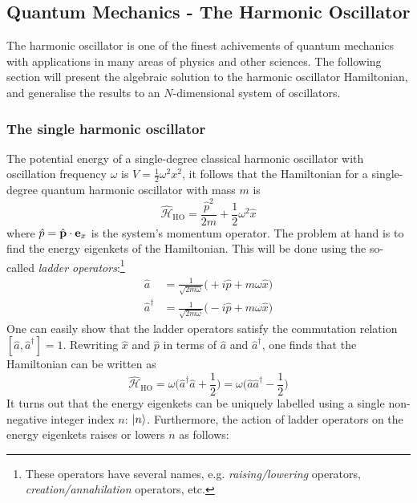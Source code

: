 \documentclass[nofootinbib,reprint,english]{revtex4-1}
\newcommand{\hatHH}{\hat{\mathcal{H}}}
\begin{document}
\subsection{Quantum Mechanics - The Harmonic Oscillator}
The harmonic oscillator is one of the finest achivements of quantum mechanics with applications in many areas of physics and other sciences. The following section will present the algebraic solution to the harmonic oscillator Hamiltonian, and generalise the results to an \(N\)-dimensional system of oscillators.
\subsubsection{The single harmonic oscillator}
The potential energy of a single-degree classical harmonic oscillator with oscillation frequency \(\omega\) is \(V=\frac{1}{2}\omega^2x^2\), it follows that the Hamiltonian for a single-degree quantum harmonic oscillator with mass \(m\) is
\begin{equation}\label{eq:Hamiltonian_harmonic_oscillator}
\hatHH_\text{HO}=\frac{\hat{p}^2}{2m}+\frac{1}{2}\omega^2\hat{x}
\end{equation}
where \(\hat{p}=\hat{\vb{p}}\cdot\vb{e}_x\) is the system's momentum operator. The problem at hand is to find the energy eigenkets of the Hamiltonian. This will be done using the so-called \emph{ladder operators}:\footnote{These operators have several names, e.g. \emph{raising/lowering} operators, \emph{creation/annahilation} operators, etc.}
\begin{subequations}\label{eq:harmonic_oscillator_ladder_operators}
\begin{align}
        \hat{a}&=\frac{1}{\sqrt{2m\omega}}\big(+i\hat{p}+m\omega\hat{x}\big)\\
\hat{a}^\dagger&=\frac{1}{\sqrt{2m\omega}}\big(-i\hat{p}+m\omega\hat{x}\big)
\end{align}
\end{subequations}
One can easily show that the ladder operators satisfy the commutation relation \([\hat{a},\hat{a}^\dagger]=1\). Rewriting \(\hat{x}\) and \(\hat{p}\) in terms of \(\hat{a}\) and \(\hat{a}^\dagger\), one finds that the Hamiltonian can be written as
\begin{equation}
\hatHH_\text{HO}=\omega\bigg(\hat{a}^\dagger\hat{a}+\frac{1}{2}\bigg)=\omega\bigg(\hat{a}\hat{a}^\dagger-\frac{1}{2}\bigg)
\end{equation}
It turns out that the energy eigenkets can be uniquely labelled using a single non-negative integer index \(n\): \(\ket{n}\). Furthermore, the action of ladder operators on the energy eigenkets raises or lowers \(n\) as follows:
\end{document}
